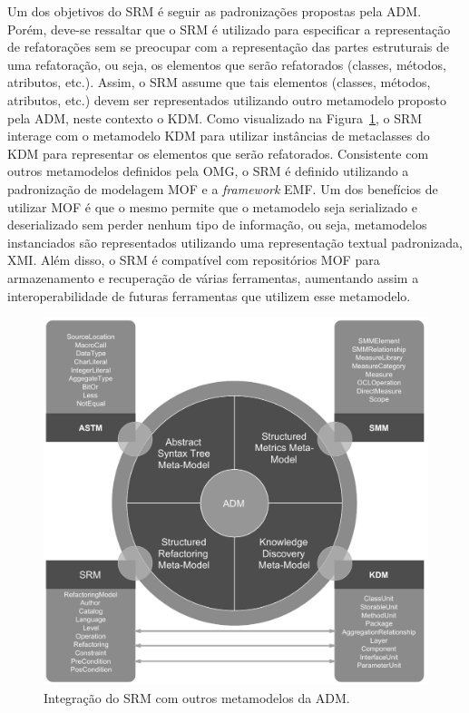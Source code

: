 Um dos objetivos do SRM é seguir as padronizações propostas pela ADM. Porém, deve-se ressaltar que o SRM é utilizado para especificar a representação de refatorações sem se preocupar com a representação das partes estruturais de uma refatoração, ou seja, os elementos que serão refatorados (classes, métodos, atributos, etc.). Assim, o SRM assume que tais elementos (classes, métodos, atributos, etc.) devem ser representados utilizando outro metamodelo proposto pela ADM, neste contexto o KDM. Como visualizado na Figura~\ref{fig:refactoring_metamodel}, o SRM interage com o metamodelo KDM para utilizar instâncias de metaclasses do KDM para representar os elementos que serão refatorados. Consistente com outros metamodelos definidos pela OMG, o SRM é definido utilizando a padronização de modelagem MOF e a \textit{framework} EMF. Um dos benefícios de utilizar MOF é que o mesmo permite que o metamodelo seja serializado e deserializado sem perder nenhum tipo de informação, ou seja, metamodelos instanciados são representados utilizando uma representação textual padronizada, XMI. Além disso, o SRM é compatível com repositórios MOF para armazenamento e recuperação de várias ferramentas, aumentando assim a interoperabilidade de futuras ferramentas que utilizem esse metamodelo.

\begin{figure}[h]
	\centering
	\caption{Integração do SRM com outros metamodelos da ADM.}
	\label{fig:refactoring_metamodel}
	\includegraphics[scale=0.65]{images/SRM2Formatted}
	\fautor
\end{figure}


